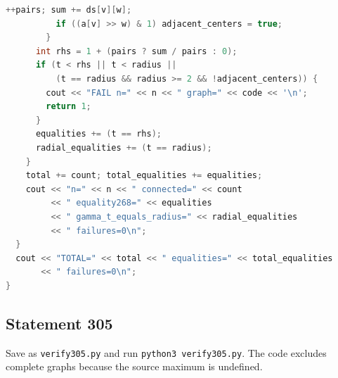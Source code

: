 \documentclass[11pt,a4paper]{article}
\theoremstyle{remark}
\begin{document}
\begin{lstlisting}[language=C++]
          ++pairs; sum += ds[v][w];
          if ((a[v] >> w) & 1) adjacent_centers = true;
        }
      int rhs = 1 + (pairs ? sum / pairs : 0);
      if (t < rhs || t < radius ||
          (t == radius && radius >= 2 && !adjacent_centers)) {
        cout << "FAIL n=" << n << " graph=" << code << '\n';
        return 1;
      }
      equalities += (t == rhs);
      radial_equalities += (t == radius);
    }
    total += count; total_equalities += equalities;
    cout << "n=" << n << " connected=" << count
         << " equality268=" << equalities
         << " gamma_t_equals_radius=" << radial_equalities
         << " failures=0\n";
  }
  cout << "TOTAL=" << total << " equalities=" << total_equalities
       << " failures=0\n";
}
\end{lstlisting}

\subsection{Statement 305}
Save as \texttt{verify305.py} and run \texttt{python3 verify305.py}.
The code excludes complete graphs because the source maximum is undefined.
\end{document}
